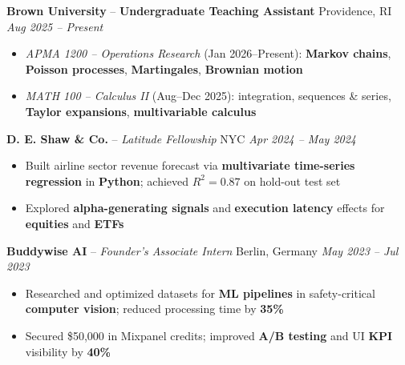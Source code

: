 \documentclass[10.5pt]{article}
\begin{document}
\textbf{Brown University} -- \textbf{Undergraduate Teaching Assistant} \hfill Providence, RI \textbar \textit{Aug 2025 -- Present} \vspace{-7pt}
\begin{itemize}
  \item \textit{APMA 1200 -- Operations Research} (Jan 2026--Present): \textbf{Markov chains}, \textbf{Poisson processes}, \textbf{Martingales}, \textbf{Brownian motion}
  \item \textit{MATH 100 -- Calculus II} (Aug--Dec 2025): integration, sequences \& series, \textbf{Taylor expansions}, \textbf{multivariable calculus}
\end{itemize}
\textbf{D. E. Shaw \& Co.} -- \textit{Latitude Fellowship} \hfill NYC \textbar \textit{Apr 2024 -- May 2024} \vspace{-7pt}
\begin{itemize}
  \item Built airline sector revenue forecast via \textbf{multivariate time-series regression} in \textbf{Python}; achieved $R^2 = 0.87$ on hold-out test set
  \item Explored \textbf{alpha-generating signals} and \textbf{execution latency} effects for \textbf{equities} and \textbf{ETFs}
\end{itemize}
\textbf{Buddywise AI} -- \textit{Founder's Associate Intern} \hfill Berlin, Germany \textbar \textit{May 2023 -- Jul 2023} \vspace{-7pt}
\begin{itemize}
  \item Researched and optimized datasets for \textbf{ML pipelines} in safety-critical \textbf{computer vision}; reduced processing time by \textbf{35\%}
  \item Secured \$50,000 in Mixpanel credits; improved \textbf{A/B testing} and UI \textbf{KPI} visibility by \textbf{40\%}
\end{itemize}
\vspace{1pt}
\end{document}
